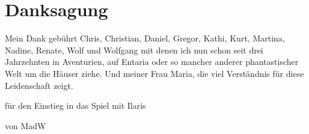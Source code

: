 \documentclass[openright]{Ilaris}
\begin{document}
\platz

\section*{Danksagung}

\normalcolor
\normalfont
\normalsize

Mein Dank gebührt Chris, Christian, Daniel, Gregor, Kathi, Kurt, Martina, Nadine, Renate, Wolf und Wolfgang mit denen ich nun schon seit drei Jahrzehnten in Aventurien, auf Entaria oder so mancher anderer phantastischer Welt um die Häuser ziehe. Und meiner Frau Maria, die viel Verständnis für diese Leidenschaft zeigt.


\platz

\neueseite

\spaltenanfang

\spaltenende


\label{spielhilfen}
\begin{center}
	\color{dunkelrot}\fontsize{16}{16}\aniron
	{für den Einstieg in das Spiel mit Ilaris}
	\normalcolor
	\normalfont
\end{center}




\begin{center}

\smallskip

	von MadW
\end{center}
\spaltenanfang
\label{dsa4}


\spaltenende
\end{document}
